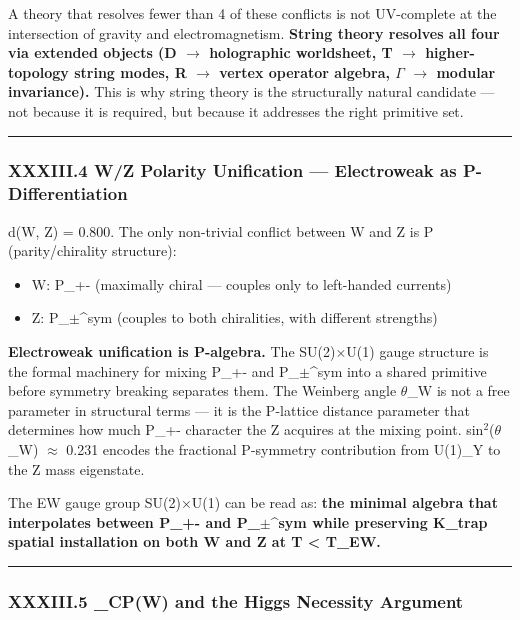 \documentclass[12pt,a4paper]{article}
\begin{document}
A theory that resolves fewer than 4 of these conflicts is not UV-complete at the intersection of gravity and electromagnetism. \textbf{String theory resolves all four via extended objects (D $\rightarrow$ holographic worldsheet, T $\rightarrow$ higher-topology string modes, R $\rightarrow$ vertex operator algebra, $\Gamma$ $\rightarrow$ modular invariance).} This is why string theory is the structurally natural candidate --- not because it is required, but because it addresses the right primitive set.

\begin{center}
\rule{0.5\textwidth}{0.4pt}
\end{center}

\subsubsection{XXXIII.4 W/Z Polarity Unification --- Electroweak as P-Differentiation}

d(W, Z) = 0.800. The only non-trivial conflict between W and Z is P (parity/chirality structure):

\begin{itemize}
    \item W: P\_+- (maximally chiral --- couples only to left-handed currents)
    \item Z: P\_$\pm$\^{}sym (couples to both chiralities, with different strengths)
\end{itemize}

\textbf{Electroweak unification is P-algebra.} The SU(2)$\times$U(1) gauge structure is the formal machinery for mixing P\_+- and P\_$\pm$\^{}sym into a shared primitive before symmetry breaking separates them. The Weinberg angle $\theta$\_W is not a free parameter in structural terms --- it is the P-lattice distance parameter that determines how much P\_+- character the Z acquires at the mixing point. sin$^{2}$($\theta$\_W) $\approx$ 0.231 encodes the fractional P-symmetry contribution from U(1)\_Y to the Z mass eigenstate.

The EW gauge group SU(2)$\times$U(1) can be read as: \textbf{the minimal algebra that interpolates between P\_+- and P\_$\pm$\^{}sym while preserving K\_trap spatial installation on both W and Z at T \textless{} T\_EW.}

\begin{center}
\rule{0.5\textwidth}{0.4pt}
\end{center}

\subsubsection{XXXIII.5 \xi\_CP(W\otimesW) and the Higgs Necessity Argument}
\end{document}
